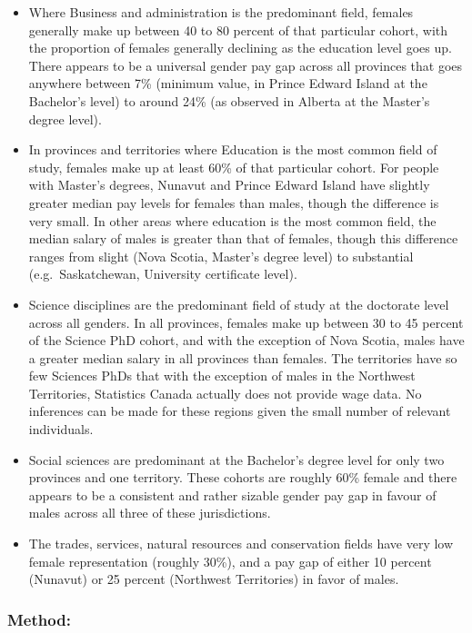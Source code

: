 \documentclass[]{article}
\providecommand{\tightlist}{%
  \setlength{\itemsep}{0pt}\setlength{\parskip}{0pt}}
\begin{document}
\begin{itemize}
\tightlist
\item
  Where Business and administration is the predominant field, females
  generally make up between 40 to 80 percent of that particular cohort,
  with the proportion of females generally declining as the education
  level goes up. There appears to be a universal gender pay gap across
  all provinces that goes anywhere between 7\% (minimum value, in Prince
  Edward Island at the Bachelor's level) to around 24\% (as observed in
  Alberta at the Master's degree level).
\item
  In provinces and territories where Education is the most common field
  of study, females make up at least 60\% of that particular cohort. For
  people with Master's degrees, Nunavut and Prince Edward Island have
  slightly greater median pay levels for females than males, though the
  difference is very small. In other areas where education is the most
  common field, the median salary of males is greater than that of
  females, though this difference ranges from slight (Nova Scotia,
  Master's degree level) to substantial (e.g.~Saskatchewan, University
  certificate level).
\item
  Science disciplines are the predominant field of study at the
  doctorate level across all genders. In all provinces, females make up
  between 30 to 45 percent of the Science PhD cohort, and with the
  exception of Nova Scotia, males have a greater median salary in all
  provinces than females. The territories have so few Sciences PhDs that
  with the exception of males in the Northwest Territories, Statistics
  Canada actually does not provide wage data. No inferences can be made
  for these regions given the small number of relevant individuals.
\item
  Social sciences are predominant at the Bachelor's degree level for
  only two provinces and one territory. These cohorts are roughly 60\%
  female and there appears to be a consistent and rather sizable gender
  pay gap in favour of males across all three of these jurisdictions.
\item
  The trades, services, natural resources and conservation fields have
  very low female representation (roughly 30\%), and a pay gap of either
  10 percent (Nunavut) or 25 percent (Northwest Territories) in favor of
  males.
\end{itemize}

\hypertarget{method-3}{%
\subsubsection{Method:}\label{method-3}}
\end{document}

